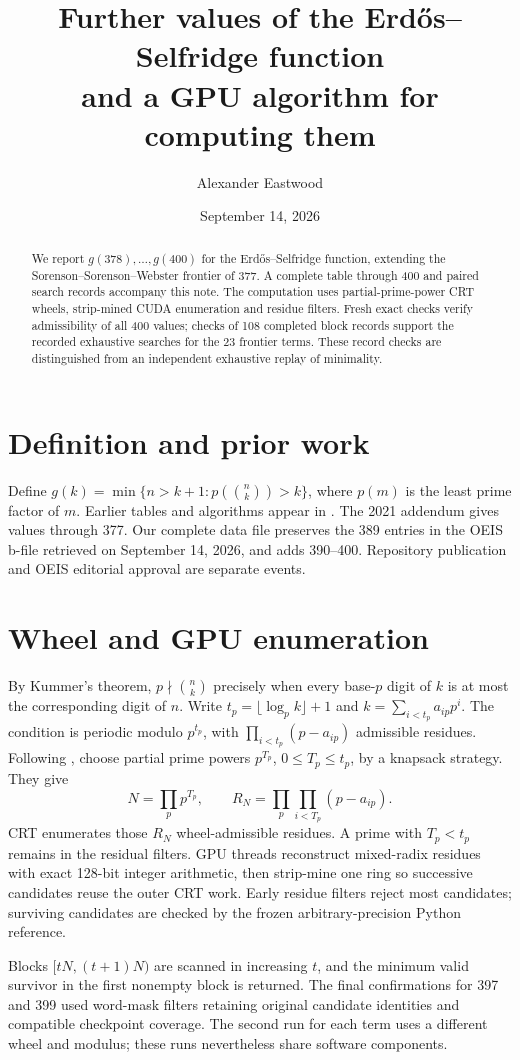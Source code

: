 \documentclass[11pt]{amsart}
\title[Values of the Erd\H{o}s--Selfridge function through 400]{Further values of the Erd\H{o}s--Selfridge function\\and a GPU algorithm for computing them}
\author{Alexander Eastwood}
\date{September 14, 2026}
\begin{document}
\begin{abstract}
We report $g(378),\ldots,g(400)$ for the Erd\H{o}s--Selfridge function, extending the
Sorenson--Sorenson--Webster frontier of 377. A complete table through 400 and paired
search records accompany this note. The computation uses partial-prime-power CRT
wheels, strip-mined CUDA enumeration and residue filters. Fresh exact checks verify
admissibility of all 400 values; checks of 108 completed block records support the
recorded exhaustive searches for the 23 frontier terms. These record checks are
distinguished from an independent exhaustive replay of minimality.
\end{abstract}
\maketitle
\section{Definition and prior work}
Define $g(k)=\min\{n>k+1:p(\binom nk)>k\}$, where $p(m)$ is the least prime factor
of $m$. Earlier tables and algorithms appear in \cite{EES74,SW92,LSW97,SSW20,SSW21}.
The 2021 addendum gives values through 377. Our complete data file preserves the
389 entries in the OEIS b-file retrieved on September 14, 2026, and adds 390--400.
Repository publication and OEIS editorial approval are separate events.
\section{Wheel and GPU enumeration}
By Kummer's theorem, $p\nmid\binom nk$ precisely when every base-$p$ digit of $k$
is at most the corresponding digit of $n$. Write $t_p=\lfloor\log_p k\rfloor+1$
and $k=\sum_{i<t_p}a_{ip}p^i$. The condition is periodic modulo $p^{t_p}$, with
$\prod_{i<t_p}(p-a_{ip})$ admissible residues. Following \cite{SSW20}, choose partial
prime powers $p^{T_p}$, $0\le T_p\le t_p$, by a knapsack strategy. They give
\[
N=\prod_p p^{T_p},\qquad R_N=\prod_p\prod_{i<T_p}(p-a_{ip}).
\]
CRT enumerates those $R_N$ wheel-admissible residues. A prime with $T_p<t_p$ remains
in the residual filters. GPU threads reconstruct mixed-radix residues with exact
128-bit integer arithmetic, then strip-mine one ring so successive candidates
reuse the outer CRT work. Early residue filters reject most candidates; surviving
candidates are checked by the frozen arbitrary-precision Python reference.

Blocks $[tN,(t+1)N)$ are scanned in increasing $t$, and the minimum valid survivor
in the first nonempty block is returned. The final confirmations for 397 and 399
used word-mask filters retaining original candidate identities and compatible
checkpoint coverage. The second run for each term uses a different wheel and
modulus; these runs nevertheless share software components.
\end{document}
